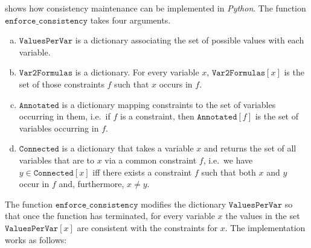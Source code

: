\noindent
{} shows how consistency maintenance can be implemented in
\textsl{Python}.
The function $\texttt{enforce\_consistency}$ takes four arguments.
\begin{enumerate}[(a)]
\item $\texttt{ValuesPerVar}$ is a dictionary associating the set of possible values with each variable.
\item $\texttt{Var2Formulas}$ is a dictionary.  For every variable $x$, $\texttt{Var2Formulas}[x]$ is
      the set of those constraints $f$ such that $x$ occurs in $f$.
\item $\texttt{Annotated}$ is a dictionary mapping constraints to the set of variables occurring in them, 
      i.e.~if $f$ is a constraint, then $\texttt{Annotated}[f]$ is the set of variables
      occurring in $f$.
\item $\texttt{Connected}$ is a dictionary that takes a variable $x$ and returns the set of all variables
      that are  to $x$ via a common constraint $f$, i.e.~we have $y \in \texttt{Connected}[x]$
      iff there exists a constraint $f$ such that both $x$ and $y$ occur in $f$ and, furthermore, $x \not= y$.
\end{enumerate}
The function $\texttt{enforce\_consistency}$ modifies the dictionary $\texttt{ValuesPerVar}$ so that once the
function has terminated, for every variable $x$ the values in the set
$\texttt{ValuesPerVar}[x]$ are consistent with the constraints for $x$.  The implementation works as follows:
